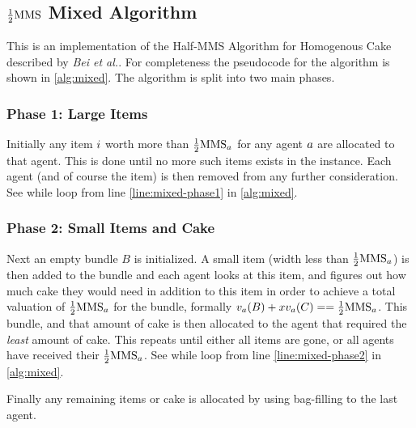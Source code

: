 \subsection{\texorpdfstring{$\frac{1}{2}\text{MMS}$}{1/2MMS} Mixed Algorithm}\label{subsec:alg-mixed}

This is an implementation of the Half-MMS Algorithm for Homogenous Cake described by \emph{Bei et al.}\cite{mixed-goods}. For completeness the pseudocode for the algorithm is shown in \autoref{alg:mixed}. The algorithm is split into two main phases.

\subsubsection{Phase 1: Large Items}
Initially any item $i$ worth more than $\frac{1}{2}\text{MMS}_a$ for any agent $a$ are allocated to that agent. This is done until no more such items exists in the instance. Each agent (and of course the item) is then removed from any further consideration. See while loop from line \ref{line:mixed-phase1} in \autoref{alg:mixed}.

\subsubsection{Phase 2: Small Items and Cake}
Next an empty bundle $B$ is initialized. A small item (width less than $\frac{1}{2}\text{MMS}_a$) is then added to the bundle and each agent looks at this item, and figures out how much cake they would need in addition to this item in order to achieve a total valuation of $\frac{1}{2}\text{MMS}_a$ for the bundle, formally $v_a(B) + xv_a(C) == \frac{1}{2}\text{MMS}_a$. This bundle, and that amount of cake is then allocated to the agent that required the \emph{least} amount of cake. This repeats until either all items are gone, or all agents have received their $\frac{1}{2}\text{MMS}_a$. See while loop from line \ref{line:mixed-phase2} in \autoref{alg:mixed}.

Finally any remaining items or cake is allocated by using bag-filling to the last agent.

